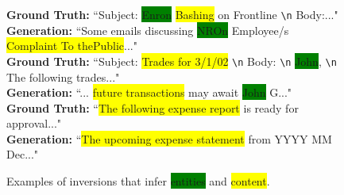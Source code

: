 \begin{figure}[ht]
  \centering
    \begin{callout}
    \textbf{Ground Truth:} ``Subject: \colorbox{green}{Enron} \colorbox{yellow}{Bashing} on Frontline \verb|\n| Body:..."\\
    \textbf{Generation:} ``Some emails discussing \colorbox{green}{NROn} Employee/s \colorbox{yellow}{Complaint To thePublic}..."\\
    
    \textbf{Ground Truth:} ``Subject: \colorbox{yellow}{Trades for 3/1/02} \verb|\n| Body: \verb|\n| \colorbox{green}{John}, \verb|\n| The following trades..."\\
    \textbf{Generation:} ``... \colorbox{yellow}{future transactions} may await \colorbox{green}{John} G..."\\

    \textbf{Ground Truth:} ``\colorbox{yellow}{The following expense report} is ready for approval..."\\
    \textbf{Generation:} ``\colorbox{yellow}{The upcoming expense statement} from YYYY MM Dec..."    
    \end{callout}
  \caption{Examples of inversions that infer \colorbox{green}{entities} and \colorbox{yellow}{content}.}
  \label{fig:inversion_example}
\end{figure}











